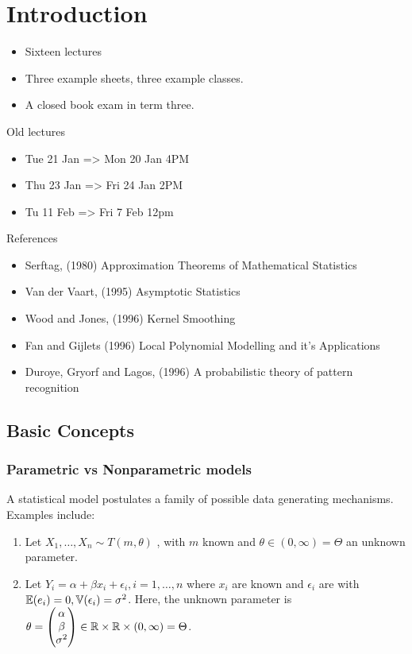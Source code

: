 \chapter{Introduction}
\label{cha:introduction}

\begin{itemize}
\item Sixteen lectures
\item Three example sheets, three example classes.
\item A closed book exam in term three.
\end{itemize}

Old lectures
\begin{itemize}
\item Tue 21 Jan => Mon 20 Jan 4PM
\item Thu 23 Jan => Fri 24 Jan 2PM
\item  Tu 11 Feb => Fri 7 Feb 12pm
\end{itemize}

References

\begin{itemize}
\item Serftag, (1980) Approximation Theorems of Mathematical Statistics
\item Van der Vaart, (1995) Asymptotic Statistics
\item Wood and Jones, (1996) Kernel Smoothing
\item Fan and Gijlets (1996) Local Polynomial Modelling and it's Applications
\item Duroye, Gryorf and Lagos, (1996) A probabilistic theory of pattern recognition

\end{itemize}

\section{Basic Concepts}
\label{sec:basic-concepts}

\subsection{Parametric vs Nonparametric models}
\label{sec:param-vs-nonp}

A statistical model postulates a family of possible data generating
mechanisms.  Examples include:
\begin{enumerate}
\item Let $X_{1}, \dots, X_{n} \sim T(m, \theta)$ \iid, with $m$ known
  and $\theta \in (0, \infty) = \Theta$ an unknown parameter.
\item Let $Y_{i} = \alpha + \beta x_{i}+ \epsilon_{i}, i = 1, \dots,
  n$ where $x_{i}$ are known and $\epsilon_{i}$ are \iid with
  $\E{e_{i}} = 0, \Var{\epsilon_{i}} = \sigma^{2}$.  Here, the unknown
  parameter is $\theta =
  \begin{pmatrix}
    \alpha \\
    \beta \\
    \sigma^{2}
  \end{pmatrix} \in \mathbb{R} \times \mathbb{R} \times (0, \infty) = \Theta$.
\end{enumerate}

